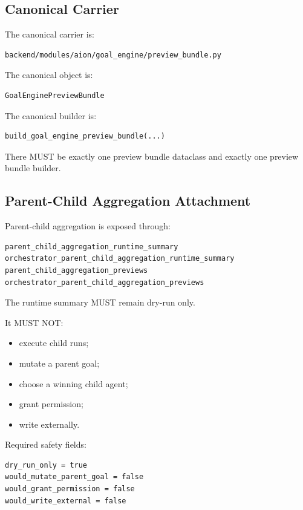 \subsection{Canonical Carrier}

The canonical carrier is:

\begin{verbatim}
backend/modules/aion/goal_engine/preview_bundle.py
\end{verbatim}

The canonical object is:

\begin{verbatim}
GoalEnginePreviewBundle
\end{verbatim}

The canonical builder is:

\begin{verbatim}
build_goal_engine_preview_bundle(...)
\end{verbatim}

There MUST be exactly one preview bundle dataclass and exactly one preview bundle builder.

\subsection{Parent-Child Aggregation Attachment}

Parent-child aggregation is exposed through:

\begin{verbatim}
parent_child_aggregation_runtime_summary
orchestrator_parent_child_aggregation_runtime_summary
parent_child_aggregation_previews
orchestrator_parent_child_aggregation_previews
\end{verbatim}

The runtime summary MUST remain dry-run only.

It MUST NOT:

\begin{itemize}
  \item execute child runs;
  \item mutate a parent goal;
  \item choose a winning child agent;
  \item grant permission;
  \item write externally.
\end{itemize}

Required safety fields:

\begin{verbatim}
dry_run_only = true
would_mutate_parent_goal = false
would_grant_permission = false
would_write_external = false
\end{verbatim}

